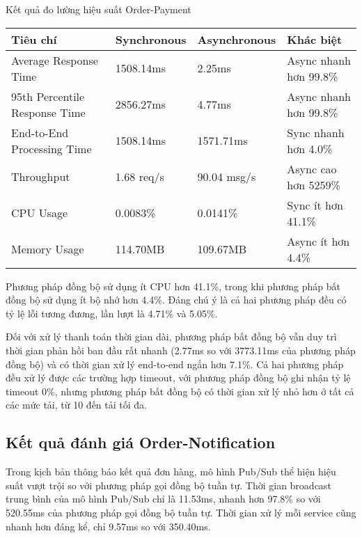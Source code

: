 \begin{table}[h]{Kết quả đo lường hiệu suất Order-Payment}
    \centering
    {\setlength{\arrayrulewidth}{1pt}
        \renewcommand{\arraystretch}{1.5}
        \setlength{\tabcolsep}{6pt}
        \begin{tabular}{|p{3.2cm}|p{3.2cm}|p{3.2cm}|p{3.2cm}|}
            \hline
            \textbf{Tiêu chí}             & \textbf{Synchronous} & \textbf{Asynchronous} & \textbf{Khác biệt}     \\
            \hline
            Average Response Time         & 1508.14ms            & 2.25ms                & Async nhanh hơn 99.8\% \\
            \hline
            95th Percentile Response Time & 2856.27ms            & 4.77ms                & Async nhanh hơn 99.8\% \\
            \hline
            End-to-End Processing Time    & 1508.14ms            & 1571.71ms             & Sync nhanh hơn 4.0\%   \\
            \hline
            Throughput                    & 1.68 req/s           & 90.04 msg/s           & Async cao hơn 5259\%   \\
            \hline
            CPU Usage                     & 0.0083\%             & 0.0141\%              & Sync ít hơn 41.1\%     \\
            \hline
            Memory Usage                  & 114.70MB             & 109.67MB              & Async ít hơn 4.4\%     \\
            \hline
        \end{tabular}}
\end{table}

Phương pháp đồng bộ sử dụng ít CPU hơn 41.1\%, trong khi phương pháp bất đồng bộ sử dụng ít bộ nhớ hơn 4.4\%. Đáng chú ý là cả hai phương pháp đều có tỷ lệ lỗi tương đương, lần lượt là 4.71\% và 5.05\%.

Đối với xử lý thanh toán thời gian dài, phương pháp bất đồng bộ vẫn duy trì thời gian phản hồi ban đầu rất nhanh (2.77ms so với 3773.11ms của phương pháp đồng bộ) và có thời gian xử lý end-to-end ngắn hơn 7.1\%. Cả hai phương pháp đều xử lý được các trường hợp timeout, với phương pháp đồng bộ ghi nhận tỷ lệ timeout 0\%, nhưng phương pháp bất đồng bộ có thời gian xử lý nhỏ hơn ở tất cả các mức tải, từ 10 đến tải tối đa.

\subsection{Kết quả đánh giá Order-Notification}
Trong kịch bản thông báo kết quả đơn hàng, mô hình Pub/Sub thể hiện hiệu suất vượt trội so với phương pháp gọi đồng bộ tuần tự. Thời gian broadcast trung bình của mô hình Pub/Sub chỉ là 11.53ms, nhanh hơn 97.8\% so với 520.55ms của phương pháp gọi đồng bộ tuần tự. Thời gian xử lý mỗi service cũng nhanh hơn đáng kể, chỉ 9.57ms so với 350.40ms.


